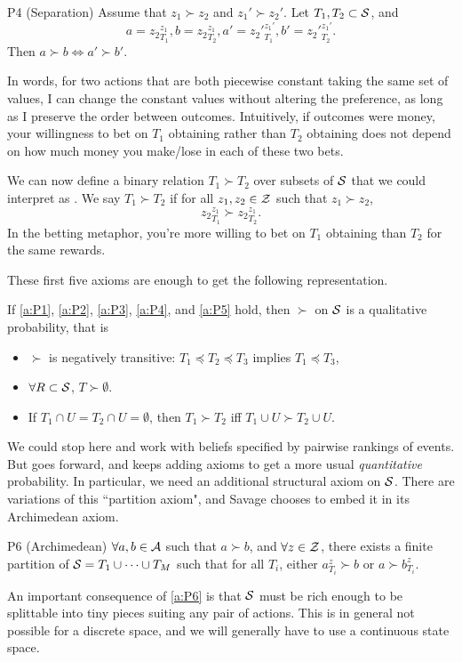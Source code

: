 \begin{axiom}{P4 (Separation)}\label{a:P4}
Assume that $z_1\succ z_2$ and $z_1'\succ z_2'$. Let $T_1,T_2\subset \mathcal{S}$, and
$$a = {z_2}_{T_1}^{z_1}, b = {z_2}_{T_2}^{z_1}, a'={z_2'}_{T_1}^{z_1'}, b'= {z_2'}_{T_2}^{z_1'}.$$
Then $a\succ b\Leftrightarrow a'\succ b'$.
\end{axiom}
In words, for two actions that are both piecewise constant taking the same set of values, I can change the constant values without altering the preference, as long as I preserve the order between outcomes. Intuitively, if outcomes were money, your willingness to bet on $T_1$ obtaining rather than $T_2$ obtaining does not depend on how much money you make/lose in each of these two bets.

We can now define a binary relation $T_1\succ T_2$ over subsets of $\mathcal{S}$ that we could interpret as . We say $T_1\succ T_2$ if for all $z_1, z_2\in\mathcal{Z}$ such that $z_1\succ z_2$,
$$
{z_2}_{T_1}^{z_1} \succ {z_2}_{T_2}^{z_1}.
$$
In the betting metaphor, you're more willing to bet on $T_1$ obtaining than $T_2$ for the same 
rewards.

These first five axioms are enough to get the following representation.
\begin{theorem}
If \ref{a:P1}, \ref{a:P2}, \ref{a:P3}, \ref{a:P4}, and \ref{a:P5} hold, then $\succ$ on $\mathcal{S}$ is a qualitative probability, that is
\begin{itemize}
\item $\succ$ is negatively transitive: $T_1\preccurlyeq T_2 \preccurlyeq T_3$ implies $T_1\preccurlyeq T_3$,
\item $\forall R\subset \mathcal{S}$, $T\succ \emptyset$.
\item If $T_1\cap U = T_2\cap U=\emptyset$, then $T_1\succ T_2$ iff $T_1\cup U\succ T_2\cup U$.
\end{itemize}
\end{theorem}

We could stop here and work with beliefs specified by pairwise rankings of events.
 But \cite{Sav54} goes forward, and keeps adding axioms to get a more usual \emph{quantitative} probability. 
 In particular, we need an additional structural axiom on $\mathcal{S}$. 
 There are variations of this ``partition axiom", and Savage chooses to embed it in its Archimedean axiom.

\begin{axiom}{P6 (Archimedean)}\label{a:P6}
$\forall a,b\in\mathcal{A}$ such that $a\succ b$, and $\forall z\in\mathcal{Z}$, there exists a finite partition of $\mathcal{S} = T_1\cup\dots\cup T_M$ such that for all $T_i$, either
$a_{T_i}^z \succ b$ or $a\succ b_{T_i}^z$.
\end{axiom}
An important consequence of \ref{a:P6} is that $\mathcal{S}$ must be rich enough to be splittable into tiny pieces suiting any pair of actions. 
This is in general not possible for a discrete space, and we will generally have to use a continuous state space. 

